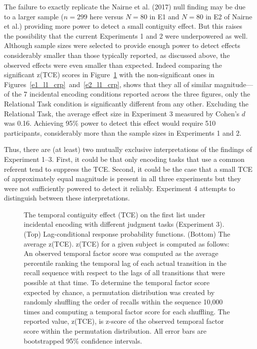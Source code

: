 \documentclass[man,natbib,floatsintext]{apa6} %
\begin{document}
The failure to exactly replicate the Nairne et al. (2017) null finding may be due to a larger sample ($n=299$ here versus $N=80$ in E1 and $N=80$ in E2 of Nairne et al.) providing more power to detect a small contiguity effect. But this raises the possibility that the current Experiments 1 and 2 were underpowered as well. Although sample sizes were selected to provide enough power to detect effects considerably smaller than those typically reported, as discussed above, the observed effects were even smaller than expected. Indeed comparing the significant z(TCE) scores in Figure~\ref{e3_l1_crp} with the non-significant ones in Figures~\ref{e1_l1_crp}~and~\ref{e2_l1_crp}, shows that they all of similar magnitude---of the 7 incidental encoding conditions reported across the three figures, only the Relational Task condition is significantly different from any other. Excluding the Relational Task, the average effect size in Experiment 3 measured by Cohen's $d$ was 0.16. Achieving 95\% power to detect this effect would require 510 participants, considerably more than the sample sizes in Experiments 1 and 2.

Thus, there are (at least) two mutually exclusive interpretations of the findings of Experiment 1--3. First, it could be that only encoding tasks that use a common referent tend to suppress the TCE. Second, it could be the case that a small TCE of approximately equal magnitude is present in all three experiments but they were not sufficiently powered to detect it reliably. Experiment 4 attempts to distinguish between these interpretations.

\begin{figure}%
\caption{The temporal contiguity effect (TCE) on the first list under incidental encoding with different judgment tasks (Experiment 3). (Top) Lag-conditional response probability functions. (Bottom) The average z(TCE). z(TCE) for a given subject is computed as follows: An observed temporal factor score was computed as the average percentile ranking the temporal lag of each actual transition in the recall sequence with respect to the lags of all transitions that were possible at that time. To determine the temporal factor score expected by chance, a permutation distribution was created by randomly shuffling the order of recalls within the sequence 10,000 times and computing a temporal factor score for each shuffling. The reported value, z(TCE), is z-score of the observed temporal factor score within the permutation distribution. All error bars are bootstrapped 95\% confidence intervals.}
\label{e3_l1_crp}
\end{figure}
\end{document}

